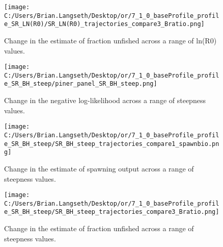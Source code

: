 \documentclass[11pt,
  english,
  a4paper,
]{article}
\begin{document}
\tagmcend\tagstructend


\begin{figure}
\centering
\texttt{[image: C:/Users/Brian.Langseth/Desktop/or/7\_1\_0\_baseProfile\_profile\_SR\_LN(R0)/SR\_LN(R0)\_trajectories\_compare3\_Bratio.png]}
\caption{Change in the estimate of fraction unfished across a range of ln(R0) values.\label{fig:r0-depl}}
\end{figure}

\tagmcend\tagstructend


\begin{figure}
\centering
\texttt{[image: C:/Users/Brian.Langseth/Desktop/or/7\_1\_0\_baseProfile\_profile\_SR\_BH\_steep/piner\_panel\_SR\_BH\_steep.png]}
\caption{Change in the negative log-likelihood across a range of steepness values.\label{fig:h-profile}}
\end{figure}

\tagmcend\tagstructend


\begin{figure}
\centering
\texttt{[image: C:/Users/Brian.Langseth/Desktop/or/7\_1\_0\_baseProfile\_profile\_SR\_BH\_steep/SR\_BH\_steep\_trajectories\_compare1\_spawnbio.png]}
\caption{Change in the estimate of spawning output across a range of steepness values.\label{fig:h-ssb}}
\end{figure}

\tagmcend\tagstructend


\begin{figure}
\centering
\texttt{[image: C:/Users/Brian.Langseth/Desktop/or/7\_1\_0\_baseProfile\_profile\_SR\_BH\_steep/SR\_BH\_steep\_trajectories\_compare3\_Bratio.png]}
\caption{Change in the estimate of fraction unfished across a range of steepness values.\label{fig:h-depl}}
\end{figure}
\end{document}
